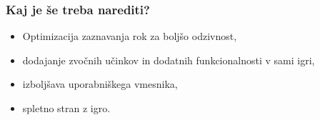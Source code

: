 \documentclass{beamer}
\begin{document}
\begin{frame}
\frametitle{Kaj je še treba narediti?}
\begin{itemize}
    \item Optimizacija zaznavanja rok za boljšo odzivnost,
    \item dodajanje zvočnih učinkov in dodatnih funkcionalnosti v sami igri,
    \item izboljšava uporabniškega vmesnika,
    \item spletno stran z igro.
\end{itemize}
\end{frame}
\end{document}
